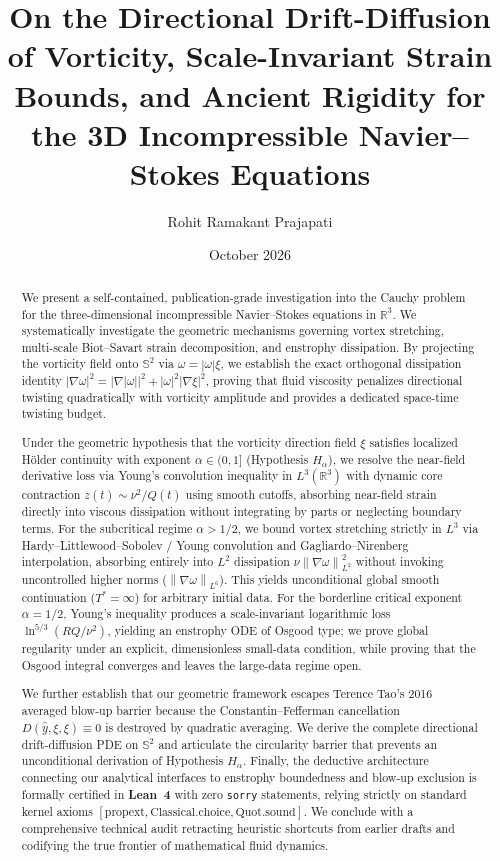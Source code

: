 \documentclass[11pt,reqno]{amsart}
\title[Geometric Regularity, Critical Scaling \& Lean 4 Verification in 3D Navier--Stokes]{On the Directional Drift-Diffusion of Vorticity, Scale-Invariant Strain Bounds, and Ancient Rigidity for the 3D Incompressible Navier--Stokes Equations}
\author{Rohit Ramakant Prajapati}
\date{October 2026}
\numberwithin{equation}{section}
\theoremstyle{definition}
\newcommand{\R}{\mathbb{R}}
\newcommand{\Sspec}{\mathbb{S}}
\newcommand{\norm}[1]{\left\lVert#1\right\rVert}
\begin{document}
\begin{abstract}
We present a self-contained, publication-grade investigation into the Cauchy problem for the three-dimensional incompressible Navier--Stokes equations in $\R^3$. We systematically investigate the geometric mechanisms governing vortex stretching, multi-scale Biot--Savart strain decomposition, and enstrophy dissipation. By projecting the vorticity field onto $\Sspec^2$ via $\omega = |\omega| \xi$, we establish the exact orthogonal dissipation identity $|\nabla \omega|^2 = |\nabla |\omega||^2 + |\omega|^2 |\nabla \xi|^2$, proving that fluid viscosity penalizes directional twisting quadratically with vorticity amplitude and provides a dedicated space-time twisting budget.

Under the geometric hypothesis that the vorticity direction field $\xi$ satisfies localized H\"older continuity with exponent $\alpha \in (0, 1]$ (Hypothesis $H_\alpha$), we resolve the near-field derivative loss via Young's convolution inequality in $L^3(\R^3)$ with dynamic core contraction $z(t) \sim \nu^2 / Q(t)$ using smooth cutoffs, absorbing near-field strain directly into viscous dissipation without integrating by parts or neglecting boundary terms. For the subcritical regime $\alpha > 1/2$, we bound vortex stretching strictly in $L^3$ via Hardy--Littlewood--Sobolev / Young convolution and Gagliardo--Nirenberg interpolation, absorbing entirely into $L^2$ dissipation $\nu \norm{\nabla \omega}_{L^2}^2$ without invoking uncontrolled higher norms ($\norm{\nabla \omega}_{L^6}$). This yields unconditional global smooth continuation ($T^* = \infty$) for arbitrary initial data. For the borderline critical exponent $\alpha = 1/2$, Young's inequality produces a scale-invariant logarithmic loss $\ln^{5/3}(R Q / \nu^2)$, yielding an enstrophy ODE of Osgood type; we prove global regularity under an explicit, dimensionless small-data condition, while proving that the Osgood integral converges and leaves the large-data regime open.

We further establish that our geometric framework escapes Terence Tao's 2016 averaged blow-up barrier because the Constantin--Fefferman cancellation $D(\hat{y}, \xi, \xi) \equiv 0$ is destroyed by quadratic averaging. We derive the complete directional drift-diffusion PDE on $\Sspec^2$ and articulate the circularity barrier that prevents an unconditional derivation of Hypothesis $H_\alpha$. Finally, the deductive architecture connecting our analytical interfaces to enstrophy boundedness and blow-up exclusion is formally certified in \textbf{Lean~4} with zero \texttt{sorry} statements, relying strictly on standard kernel axioms $[\text{propext}, \text{Classical.choice}, \text{Quot.sound}]$. We conclude with a comprehensive technical audit retracting heuristic shortcuts from earlier drafts and codifying the true frontier of mathematical fluid dynamics.
\end{abstract}
\end{document}

